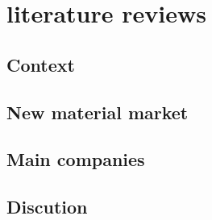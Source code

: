 \chapter{literature reviews}

\section{Context}






\section{New material market}




\section{Main companies}




\section{Discution}